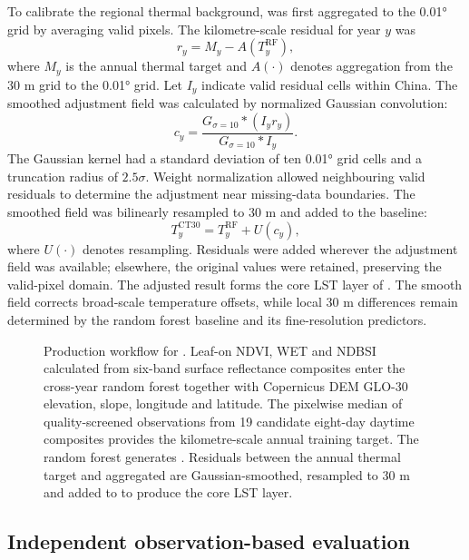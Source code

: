 To calibrate the regional thermal background, \rf{} was first aggregated to the 0.01° grid by averaging valid pixels. The kilometre-scale residual for year $y$ was
\begin{equation}
r_y=M_y-A(T_y^{\mathrm{RF}}),
\end{equation}
where $M_y$ is the annual thermal target and $A(\cdot)$ denotes aggregation from the 30 m grid to the 0.01° grid. Let $I_y$ indicate valid residual cells within China. The smoothed adjustment field was calculated by normalized Gaussian convolution:
\begin{equation}
c_y=\frac{G_{\sigma=10}*(I_y r_y)}{G_{\sigma=10}*I_y}.
\end{equation}
The Gaussian kernel had a standard deviation of ten 0.01° grid cells and a truncation radius of $2.5\sigma$. Weight normalization allowed neighbouring valid residuals to determine the adjustment near missing-data boundaries. The smoothed field was bilinearly resampled to 30 m and added to the baseline:
\begin{equation}
T_y^{\mathrm{CT30}}=T_y^{\mathrm{RF}}+U(c_y),
\end{equation}
where $U(\cdot)$ denotes resampling. Residuals were added wherever the adjustment field was available; elsewhere, the original \rf{} values were retained, preserving the valid-pixel domain. The adjusted result forms the core LST layer of \chinatherm{}. The smooth field corrects broad-scale temperature offsets, while local 30 m differences remain determined by the random forest baseline and its fine-resolution predictors.

\begin{figure}[H]
\centering
{}
\ReviewFloatBegin
\caption{Production workflow for \chinatherm{}. Leaf-on NDVI, WET and NDBSI calculated from six-band surface reflectance composites enter the cross-year random forest together with Copernicus DEM GLO-30 elevation, slope, longitude and latitude. The pixelwise median of quality-screened observations from 19 candidate eight-day daytime composites provides the kilometre-scale annual training target. The random forest generates \rf{}. Residuals between the annual thermal target and aggregated \rf{} are Gaussian-smoothed, resampled to 30 m and added to \rf{} to produce the core \chinatherm{} LST layer.}
\label{fig:workflow}
\ReviewFloatEnd
\end{figure}

\subsection{Independent observation-based evaluation}


